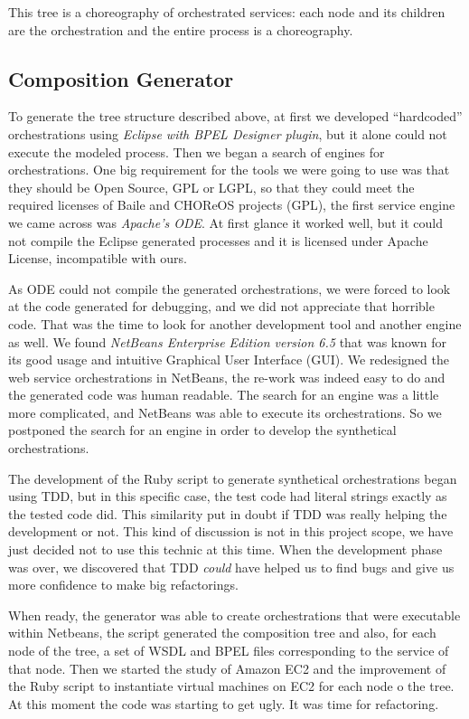 This tree is a choreography of orchestrated services: each node and its children are the orchestration and the entire process is a choreography.

\subsection{Composition Generator}
To generate the tree structure described above, at first we developed ``hardcoded'' orchestrations using \emph{Eclipse with BPEL Designer plugin}, but it alone could not execute the modeled process. Then we began a search of engines for orchestrations. One big requirement for the tools we were going to use was that they should be Open Source, GPL or LGPL, so that they could meet the required licenses of Baile and CHOReOS projects (GPL), the first service engine we came across was \emph{Apache's ODE}. At first glance it worked well, but it could not compile the Eclipse generated processes and it is licensed under Apache License, incompatible with ours.

As ODE could not compile the generated orchestrations, we were forced to look at the code generated for debugging, and we did not appreciate that horrible code. That was the time to look for another development tool and another engine as well. We found \emph{NetBeans Enterprise Edition version 6.5} that was known for its good usage and intuitive Graphical User Interface (GUI). We redesigned the web service orchestrations in NetBeans, the re-work was indeed easy to do and the generated code was human readable. The search for an engine was a little more complicated, and NetBeans was able to execute its orchestrations. So we postponed the search for an engine in order to develop the synthetical orchestrations.

The development of the Ruby script to generate synthetical orchestrations began using TDD, but in this specific case, the test code had literal strings exactly as the tested code did. This similarity put in doubt if TDD was really helping the development or not. This kind of discussion is not in this project scope, we have just decided not to use this technic at this time. When the development phase was over, we discovered that TDD \emph{could} have helped us to find bugs and give us more confidence to make big refactorings.

When ready, the generator was able to create orchestrations that were executable within Netbeans, the script generated the composition tree and also, for each node of the tree, a set of WSDL and BPEL files corresponding to the service of that node. Then we started the study of Amazon EC2 and the improvement of the Ruby script to instantiate virtual machines on EC2 for each node o the tree. At this moment the code was starting to get ugly. It was time for refactoring.

